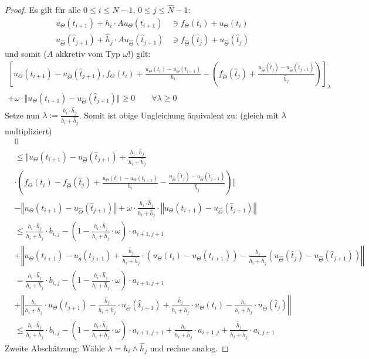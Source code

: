 \begin{proof}
	Es gilt für alle $0\leq i\leq N-1$, $0\leq j\leq\hat{N}-1$:
	\begin{align*}
		u_\Theta(t_{i+1})+h_i\cdot Au_\Theta(t_{i+1})&\ni f_\Theta(t_i)+u_\Theta(t_i)\\
		u_{\hat{\Theta}}(\hat{t}_{j+1})+\hat{h}_j\cdot Au_{\hat{\Theta}}(\hat{t}_{j+1})&\ni f_{\hat{\Theta}}(\hat{t}_j)+u_{\hat{\Theta}}(\hat{t}_{j})
	\end{align*}
	und somit ($A$ akkretiv vom Typ $\omega$!) gilt:
	\begin{align*}
		\left[u_\Theta(t_{i+1})-u_{\hat{\Theta}}(\hat{t}_{j+1}),f_\Theta(t_i)+\frac{u_\Theta(t_i)-u_\Theta(t_{i+1})}{h_i}-\left(f_{\hat{\Theta}}(\hat{t}_j)+\frac{u_{\hat{\Theta}}(\hat{t}_j)-u_{\hat{\Theta}}(\hat{t}_{j+1})}{\hat{h}_j}\right)\right]_\lambda\\
		+\omega\cdot\Big\Vert u_\Theta(t_{i+1})-u_{\hat{\Theta}}(\hat{t}_{j+1})\Big\Vert\geq0\qquad\forall\lambda\geq0
	\end{align*}
	Setze nun $\lambda:=\frac{h_i\cdot\hat{h}_j}{h_i+\hat{h}_j}$. Somit ist obige Ungleichung äquivalent zu: (gleich mit $\lambda$ multipliziert)
	\begin{align*}
		&0\\
		&\leq
		\Bigg\Vert u_\Theta(t_{i+1})-u_{\hat{\Theta}}(\hat{t}_{j+1})+\frac{h_i\cdot\hat{h}_j}{h_i+\hat{h}_j}\\
		&\cdot\left(f_\Theta(t_i)-f_{\hat{\Theta}}(\hat{t}_j)+\frac{u_\Theta(t_i)-u_\Theta(t_{i+1})}{h_i}-\frac{u_{\hat{\Theta}}(\hat{t}_j)-u_{\hat{\Theta}}(\hat{t}_{j+1})}{\hat{h}_j}\right)\Bigg\Vert\\
		&-\left\Vert u_\Theta(t_{i+1})-u_{\hat{\Theta}}(\hat{t}_{j+1})\right\Vert
		+\omega\cdot\frac{h_i\cdot\hat{h}_j}{h_i+\hat{h}_j}\cdot\left\Vert u_\Theta(t_{i+1})-u_{\hat{\Theta}}(\hat{t}_{j+1})\right\Vert\\
		&\leq
		\frac{h_i\cdot\hat{h}_j}{h_i+\hat{h}_j}\cdot b_{i,j}-\left(1-\frac{h_i\cdot\hat{h}_j}{h_i+\hat{h}_j}\cdot\omega\right)\cdot a_{i+1,j+1}\\
		&+\left\Vert u_\Theta(t_{i+1})-u_{\hat{\theta}}(t_{j+1})+\frac{\hat{h}_j}{h_i+\hat{h}_j}\cdot\left(u_\Theta(t_i)-u_\Theta(t_{i+1})\right)-\frac{h_i}{h_i+\hat{h}_j} %
		\left(u_{\hat{\Theta}}(\hat{t}_j)-u_{\hat{\Theta}}(\hat{t}_{j+1})\right)\right\Vert\\
		&=\frac{h_i\cdot\hat{h}_j}{h_i+\hat{h}_j}\cdot b_{i,j}-\left(1-\frac{h_i\cdot\hat{h}_j}{h_i+\hat{h}_j}\cdot\omega\right)\cdot a_{i+1,j+1}\\
		&+\left\Vert\frac{h_i}{h_i+\hat{h}_j}\cdot u_\Theta(t_{j+1})-\frac{\hat{h}_j}{h_i+\hat{h}_j}\cdot u_{\hat{\Theta}}(\hat{t}_{j+1})+\frac{\hat{h}_j}{h_i+\hat{h}_j}\cdot u_\Theta(t_i)-\frac{h_i}{h_i+\hat{h}_j}\cdot u_{\hat{\Theta}}(\hat{t}_j)\right\Vert\\
		&\leq
		\frac{h_i\cdot\hat{h}_j}{h_i+\hat{h}_j}\cdot b_{i,j}-\left(1-\frac{h_i\cdot\hat{h}_j}{h_i+\hat{h}_j}\cdot\omega\right)\cdot a_{i+1,j+1}
		+\frac{h_i}{h_i+\hat{h}_j}\cdot a_{i+1,j}+\frac{\hat{h}_j}{h_i+\hat{h}_j}\cdot a_{i,j+1}
	\end{align*}
	Zweite Abschätzung: Wähle $\lambda=h_i\wedge\hat{h}_j$ und rechne analog.
\end{proof}

